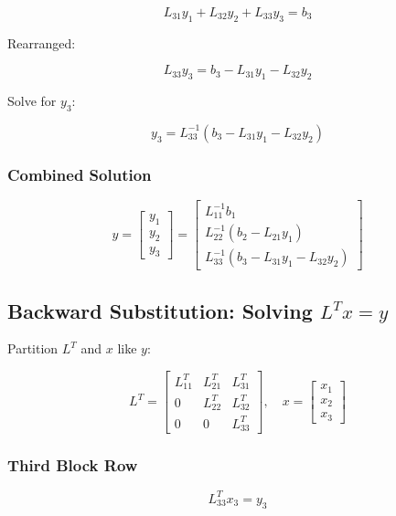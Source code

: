 \documentclass[
  letterpaper,
  DIV=11,
  numbers=noendperiod]{scrartcl}
\begin{document}
\[
L_{31}y_1 + L_{32}y_2 + L_{33}y_3 = b_3
\]

Rearranged:

\[
L_{33}y_3 = b_3 - L_{31}y_1 - L_{32}y_2
\]

Solve for \(y_3\):

\[
y_3 = L_{33}^{-1}\left(b_3 - L_{31}y_1 - L_{32}y_2\right)
\]

\subsubsection{\texorpdfstring{\textbf{Combined
Solution}}{Combined Solution}}\label{combined-solution}

\[
y = \begin{bmatrix}
y_1 \\
y_2 \\
y_3
\end{bmatrix} =
\begin{bmatrix}
 L_{11}^{-1}b_1 \\
L_{22}^{-1}\left(b_2 - L_{21}y_1\right) \\
L_{33}^{-1}\left(b_3 - L_{31}y_1 - L_{32}y_2\right)
\end{bmatrix}
\]

\subsection{\texorpdfstring{Backward Substitution: Solving
\(L^Tx = y\)}{Backward Substitution: Solving L\^{}Tx = y}}\label{backward-substitution-solving-ltx-y}

Partition \(L^T\) and \(x\) like \(y\):

\[
L^T = \begin{bmatrix}
L_{11}^T & L_{21}^T & L_{31}^T \\
0 & L_{22}^T & L_{32}^T \\
0 & 0 & L_{33}^T
\end{bmatrix}, \quad
x = \begin{bmatrix}
x_1 \\
x_2 \\
x_3
\end{bmatrix}
\]

\subsubsection{\texorpdfstring{\textbf{Third Block
Row}}{Third Block Row}}\label{third-block-row-1}

\[
L_{33}^Tx_3 = y_3
\]
\end{document}

